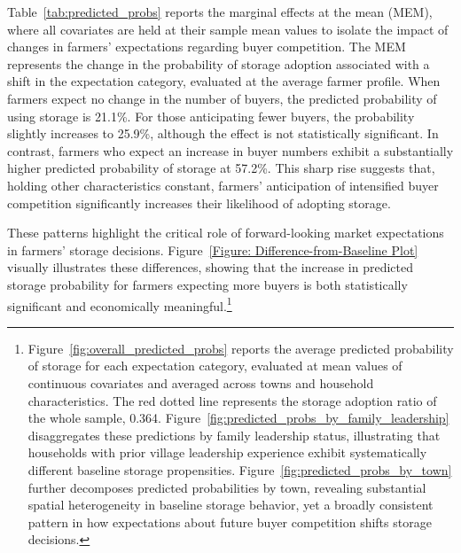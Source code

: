 Table~\ref{tab:predicted_probs} reports the marginal effects at the mean (MEM), where all covariates are held at their sample mean values to isolate the impact of changes in farmers' expectations regarding buyer competition. The MEM represents the change in the probability of storage adoption associated with a shift in the expectation category, evaluated at the average farmer profile. When farmers expect no change in the number of buyers, the predicted probability of using storage is 21.1\%. For those anticipating fewer buyers, the probability slightly increases to 25.9\%, although the effect is not statistically significant. In contrast, farmers who expect an increase in buyer numbers exhibit a substantially higher predicted probability of storage at 57.2\%. This sharp rise suggests that, holding other characteristics constant, farmers' anticipation of intensified buyer competition significantly increases their likelihood of adopting storage.

These patterns highlight the critical role of forward-looking market expectations in farmers' storage decisions. Figure~\ref{Figure: Difference-from-Baseline Plot} visually illustrates these differences, showing that the increase in predicted storage probability for farmers expecting more buyers is both statistically significant and economically meaningful.\footnote{Figure~\ref{fig:overall_predicted_probs} reports the average predicted probability of storage for each expectation category, evaluated at mean values of continuous covariates and averaged across towns and household characteristics. The red dotted line represents the storage adoption ratio of the whole sample, 0.364. Figure~\ref{fig:predicted_probs_by_family_leadership} disaggregates these predictions by family leadership status, illustrating that households with prior village leadership experience exhibit systematically different baseline storage propensities. Figure~\ref{fig:predicted_probs_by_town} further decomposes predicted probabilities by town, revealing substantial spatial heterogeneity in baseline storage behavior, yet a broadly consistent pattern in how expectations about future buyer competition shifts storage decisions.}




